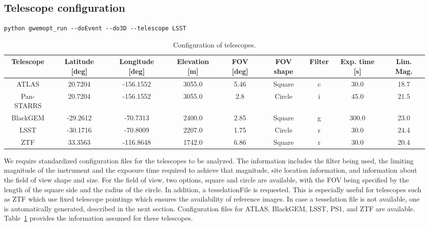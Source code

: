 \documentclass[twocolumn]{aastex61}
\begin{document}
\subsection{Telescope configuration}
\begin{lstlisting}
python gwemopt_run --doEvent --do3D --telescope LSST
\end{lstlisting}
\begin{table}[t]
\scriptsize
\centering
\begin{tabular}{|c|c|c|c|c|c|c|c|c|}
\hline
Telescope & Latitude {[}deg{]} & Longitude {[}deg{]} & Elevation {[}m{]} & FOV {[}deg{]} & FOV shape & Filter & Exp. time {[}s{]} & Lim. Mag. \\ \hline
ATLAS          & 20.7204            & -156.1552           & 3055.0            & 5.46                                      & Square              & c      & 30.0                  & 18.7               \\ \hline
Pan-STARRS     & 20.7204            & -156.1552           & 3055.0            & 2.8                                       & Circle              & i      & 45.0                  & 21.5               \\ \hline
BlackGEM       & -29.2612           & -70.7313            & 2400.0            & 2.85                                      & Square              & g      & 300.0                 & 23.0               \\ \hline
LSST           & -30.1716           & -70.8009            & 2207.0            & 1.75                                      & Circle              & r      & 30.0                  & 24.4               \\ \hline
ZTF            & 33.3563            & -116.8648           & 1742.0            & 6.86                                      & Square              & r      & 30.0                  & 20.4               \\ \hline
\end{tabular}
\caption{Configuration of telescopes.}
\label{table:config}
\end{table}
We require standardized configuration files for the telescopes to be analyzed. 
The information includes the filter being used, the limiting magnitude of the instrument and the exposure time required to achieve that magnitude, site location information, and information about the field of view shape and size. For the field of view, two options, square and circle are available, with the FOV being specified by the length of the square side and the radius of the circle. In addition, a tesselationFile is requested. This is especially useful for telescopes such as ZTF which use fixed telescope pointings which ensures the availability of reference images. In case a tesselation file is not available, one is automatically generated, described in the next section.
Configuration files for ATLAS, BlackGEM, LSST, PS1, and ZTF are available.
Table~\ref{table:config} provides the information assumed for these telescopes.\\
\end{document}
